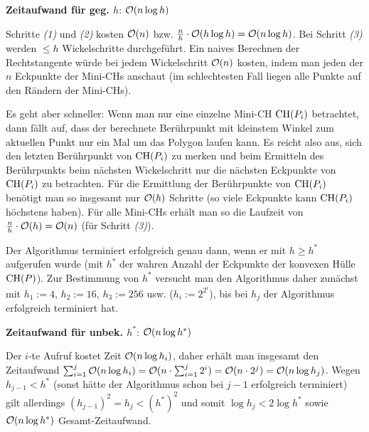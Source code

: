 \linie

\textbf{Zeitaufwand für geg. $h$}:
$\mathcal{O}(n \log h)$

\begin{Beweis}
    Schritte \emph{(1)} und \emph{(2)} kosten $\mathcal{O}(n)$ bzw.
    $\frac{n}{h} \cdot \mathcal{O}(h \log h) = \mathcal{O}(n \log h)$.
    Bei Schritt \emph{(3)} werden $\le h$ Wickelschritte durchgeführt.
    Ein naives Berechnen der Rechtstangente würde bei jedem Wickelschritt $\mathcal{O}(n)$ kosten,
    indem man jeden der $n$ Eckpunkte der Mini-CHs anschaut
    (im schlechtesten Fall liegen alle Punkte auf den Rändern der Mini-CHs).

    Es geht aber schneller:
    Wenn man nur eine einzelne Mini-CH $\operatorname{CH}(P_i)$ betrachtet, dann fällt auf,
    dass der berechnete Berührpunkt mit kleinstem Winkel zum aktuellen Punkt
    nur ein Mal um das Polygon laufen kann.
    Es reicht also aus, sich den letzten Berührpunkt von $\operatorname{CH}(P_i)$ zu merken und
    beim Ermitteln des Berührpunkts beim nächsten Wickelschritt nur die nächsten Eckpunkte
    von $\operatorname{CH}(P_i)$ zu betrachten.
    Für die Ermittlung der Berührpunkte von $\operatorname{CH}(P_i)$ benötigt man so insgesamt nur
    $\mathcal{O}(h)$ Schritte (so viele Eckpunkte kann $\operatorname{CH}(P_i)$ höchstens haben).
    Für alle Mini-CHs erhält man so die Laufzeit von $\frac{n}{h} \cdot \mathcal{O}(h) = \mathcal{O}(n)$
    (für Schritt \emph{(3)}).
\end{Beweis}

\linie

Der Algorithmus terminiert erfolgreich genau dann, wenn er mit $h \ge h^\ast$ aufgerufen wurde
(mit $h^\ast$ der wahren Anzahl der Eckpunkte der konvexen Hülle $\operatorname{CH}(P)$).
Zur Bestimmung von $h^\ast$ versucht man den Algorithmus daher zunächst mit
$h_1 := 4$, $h_2 := 16$, $h_3 := 256$ usw. ($h_i := 2^{2^i}$),
bis bei $h_j$ der Algorithmus erfolgreich terminiert hat.

\textbf{Zeitaufwand für unbek. $h^\ast$}: $\mathcal{O}(n \log h^\ast)$

\begin{Beweis}
    Der $i$-te Aufruf kostet Zeit $\mathcal{O}(n \log h_i)$, daher erhält man insgesamt den Zeitaufwand
    $\sum_{i=1}^j \mathcal{O}(n \log h_i) = \mathcal{O}(n \cdot \sum_{i=1}^j 2^i) =
    \mathcal{O}(n \cdot 2^j) = \mathcal{O}(n \log h_j)$.
    Wegen $h_{j-1} < h^\ast$ (sonst hätte der Algorithmus schon bei $j - 1$ erfolgreich terminiert)
    gilt allerdings $(h_{j-1})^2 = h_j < (h^\ast)^2$ und somit
    $\log h_j < 2 \log h^\ast$ sowie
    $\mathcal{O}(n \log h^\ast)$ Gesamt-Zeitaufwand.
\end{Beweis}

